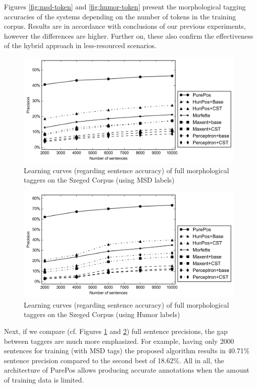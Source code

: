 Figures \ref{fig:msd-token} and \ref{fig:humor-token} present the morphological tagging accuracies of the systems depending on the number of tokens in the training corpus. 
Results are in accordance with conclusions of our previous experiments, however the differences are higher. 
Further on, these also confirm the effectiveness of the hybrid approach in less-resourced scenarios.

\begin{figure}[H]
  \centering
  \includegraphics[width=1\textwidth]{MorphTagging/msd_sent.png} 
  \caption{Learning curves (regarding sentence accuracy) of full morphological taggers on the Szeged Corpus (using MSD labels)}
  \label{fig:msd-sent}
\end{figure}

\begin{figure}[H]
  \centering
  \includegraphics[width=1\textwidth]{MorphTagging/humor_sent.png}
  \caption{Learning curves (regarding sentence accuracy) of full morphological taggers on the Szeged Corpus (using Humor labels)}
  \label{fig:humor-sent}
\end{figure}

Next, if we compare (cf. Figures \ref{fig:msd-sent} and \ref{fig:humor-sent}) full sentence precisions, the gap between taggers are much more emphasized. 
For example, having only 2000 sentences for training (with MSD tags) the proposed algorithm results in 40.71\% sentence precision compared to the second best of 18.62\%.
All in all, the architecture of PurePos allows producing accurate annotations when the amount of training data is limited. 

